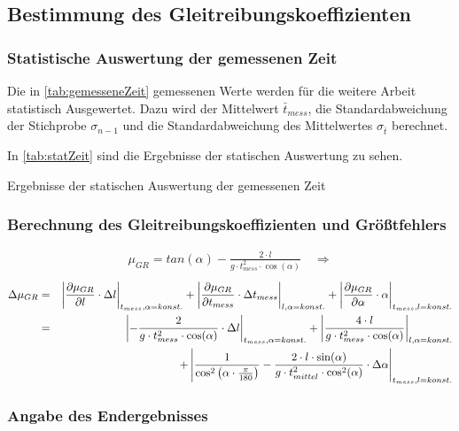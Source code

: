 \subsection{Bestimmung des Gleitreibungskoeffizienten}

\subsubsection{Statistische Auswertung der gemessenen Zeit}

Die in \autoref{tab:gemesseneZeit} gemessenen Werte werden für die weitere Arbeit statistisch Ausgewertet. Dazu wird der Mittelwert $\bar{t}_{mess}$, die Standardabweichung der Stichprobe $\sigma_{n-1}$ und die Standardabweichung des Mittelwertes $\sigma_{\bar{t}}$ berechnet.

In \autoref{tab:statZeit} sind die Ergebnisse der statischen Auswertung zu sehen.

\begin{table}[h]
    \center 
    \caption[Statistische Auswertung der gemessenen Zeit]{Ergebnisse der statischen Auswertung der gemessenen Zeit}
    
    \label{tab:statZeit}
\end{table}

\subsubsection{Berechnung des Gleitreibungskoeffizienten und Größtfehlers}

\begin{align}
    \mu_{GR} = tan(\alpha) - \frac{2 \cdot l}{g \cdot t_{mess}^2 \cdot \cos(\alpha)} \quad \Rightarrow
  \end{align}
  \begin{equation}
    \begin{alignedat}{2}
      \Delta \mu_{GR} &= &\quad \abs*{\frac{\partial \mu_{GR}}{\partial l} \cdot \Delta l}_{t_{mess},\alpha = konst.} + \abs*{\frac{\partial \mu_{GR}}{\partial t_{mess}} \cdot \Delta t_{mess}}_{l,\alpha = konst.} + \abs*{\frac{\partial \mu_{GR}}{\partial \alpha} \cdot \alpha}_{t_{mess},l = konst.}\\
      &= &\, \abs*{-\frac{2}{g \cdot t_{mess}^2 \cdot \cos(\alpha)}\cdot \Delta l}_{t_{mess},\alpha = konst.} + \abs*{\frac{4 \cdot l}{g \cdot t_{mess}^2 \cdot \cos(\alpha)}}_{l,\alpha = konst.} \\ 
      &\quad  &+ \, \abs*{\frac{1}{\cos^2\left( \alpha \cdot  \frac{\pi}{180} \right)} -\frac{2 \cdot l \cdot \sin(\alpha)}{g \cdot t_{mittel}^2 \cdot \cos^2(\alpha)} \cdot \Delta \alpha}_{t_{mess},l = konst.}
    \end{alignedat}
  \end{equation}

\subsubsection{Angabe des Endergebnisses}